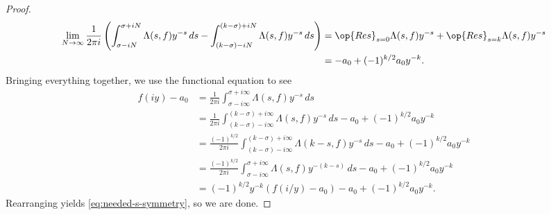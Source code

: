 \documentclass{amsart}
\begin{document}
\begin{proof}
	\begin{align*}
		\lim_{N\to\infty}\frac1{2\pi i}\left(\int_{\sigma-iN}^{\sigma+iN}\Lambda(s,f)y^{-s}\,ds-\int_{(k-\sigma)-iN}^{(k-\sigma)+iN}\Lambda(s,f)y^{-s}\,ds\right) &= \op{Res}_{s=0}\Lambda(s,f)y^{-s}+\op{Res}_{s=k}\Lambda(s,f)y^{-s} \\
		&= -a_0+(-1)^{k/2}a_0y^{-k}.
	\end{align*}
	Bringing everything together, we use the functional equation to see
	\begin{align*}
		f(iy)-a_0 &= \frac1{2\pi i}\int_{\sigma-i\infty}^{\sigma+i\infty}\Lambda(s,f)y^{-s}\,ds \\
		&= \frac1{2\pi i}\int_{(k-\sigma)-i\infty}^{(k-\sigma)+i\infty}\Lambda(s,f)y^{-s}\,ds-a_0+(-1)^{k/2}a_0y^{-k} \\
		&= \frac{(-1)^{k/2}}{2\pi i}\int_{(k-\sigma)-i\infty}^{(k-\sigma)+i\infty}\Lambda(k-s,f)y^{-s}\,ds-a_0+(-1)^{k/2}a_0y^{-k} \\
		&= \frac{(-1)^{k/2}}{2\pi i}\int_{\sigma-i\infty}^{\sigma+i\infty}\Lambda(s,f)y^{-(k-s)}\,ds-a_0+(-1)^{k/2}a_0y^{-k} \\
		&= (-1)^{k/2}y^{-k}(f(i/y)-a_0)-a_0+(-1)^{k/2}a_0y^{-k}.
	\end{align*}
	Rearranging yields \eqref{eq:needed-s-symmetry}, so we are done.
\end{proof}


\printbibliography[title={References}]
\end{document}
